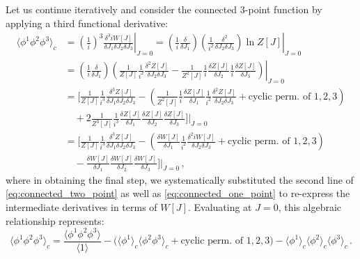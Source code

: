 Let us continue iteratively and consider the connected 3-point function by applying a third functional derivative:
\begin{equation} \label{eq:connected_three_point_derivation}
    \begin{aligned}
        \langle \phi^1 \phi^2 \phi^3 \rangle_c & = \left. \left(\frac{1}{i}\right)^3 \frac{\delta^3 iW[J]}{\delta J_1 \delta J_2 \delta J_3} \right|_{J=0} = \left. \left(\frac{1}{i}\frac{\delta}{\delta J_1}\right) \left(\frac{1}{i^2}\frac{\delta^2}{\delta J_2 \delta J_3}\right) \ln Z[J] \right|_{J=0}            \\
                                               & = \left. \left(\frac{1}{i}\frac{\delta}{\delta J_1}\right) \left( \frac{1}{Z[J]} \frac{1}{i^2} \frac{\delta^2 Z[J]}{\delta J_2 \delta J_3} - \frac{1}{Z^2[J]} \frac{1}{i}\frac{\delta Z[J]}{\delta J_2} \frac{1}{i}\frac{\delta Z[J]}{\delta J_3} \right) \right|_{J=0} \\
                                               & = \Bigg[ \frac{1}{Z[J]} \frac{1}{i^3} \frac{\delta^3 Z[J]}{\delta J_1 \delta J_2 \delta J_3} - \left( \frac{1}{Z^2[J]} \frac{1}{i}\frac{\delta Z[J]}{\delta J_1} \frac{1}{i^2}\frac{\delta^2 Z[J]}{\delta J_2 \delta J_3} + \text{cyclic perm. of } 1, 2, 3 \right)     \\
                                               & \quad + 2 \frac{1}{Z^3[J]} \frac{1}{i^3} \frac{\delta Z[J]}{\delta J_1} \frac{\delta Z[J]}{\delta J_2} \frac{\delta Z[J]}{\delta J_3} \Bigg] \Bigg|_{J=0}                                                                                                               \\
                                               & = \Bigg[ \frac{1}{Z[J]} \frac{1}{i^3} \frac{\delta^3 Z[J]}{\delta J_1 \delta J_2 \delta J_3} - \left( \frac{\delta W[J]}{\delta J_1} \frac{1}{i^2} \frac{\delta^2 iW[J]}{\delta J_2 \delta J_3} + \text{cyclic perm. of } 1, 2, 3 \right)                               \\
                                               & \quad - \frac{\delta W[J]}{\delta J_1} \frac{\delta W[J]}{\delta J_2} \frac{\delta W[J]}{\delta J_3} \Bigg] \Bigg|_{J=0} \, ,
    \end{aligned}
\end{equation}
where in obtaining the final step, we systematically substituted the second line of \eqref{eq:connected_two_point} as well as \eqref{eq:connected_one_point} to re-express the intermediate derivatives in terms of \(W[J]\). Evaluating at \(J=0\), this algebraic relationship represents:
\begin{equation} \label{eq:connected_three_point}
    \langle \phi^1 \phi^2 \phi^3 \rangle_c = \frac{\langle \phi^1 \phi^2 \phi^3 \rangle}{\langle 1 \rangle} - \Big( \langle \phi^1 \rangle_c \langle \phi^2 \phi^3 \rangle_c + \text{cyclic perm. of } 1, 2, 3 \Big) - \langle \phi^1 \rangle_c \langle \phi^2 \rangle_c \langle \phi^3 \rangle_c \, .
\end{equation}

